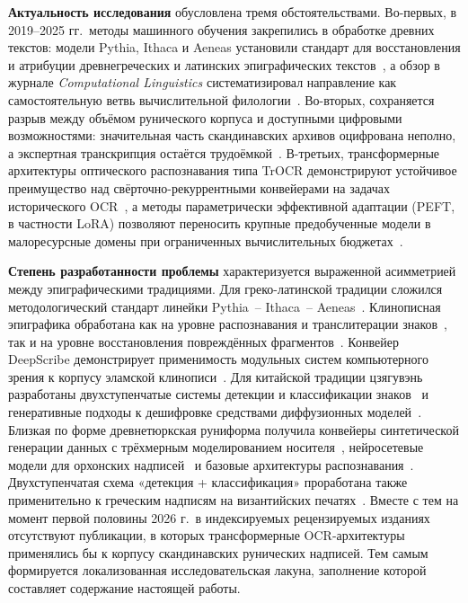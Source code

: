 \documentclass[a4paper,12pt]{extarticle}
\begin{document}
\textbf{Актуальность исследования} обусловлена тремя обстоятельствами. Во-первых, в 2019--2025 гг.\ методы машинного обучения закрепились в обработке древних текстов: модели Pythia, Ithaca и Aeneas установили стандарт для восстановления и атрибуции древнегреческих и латинских эпиграфических текстов~\cite{assael2019,assael2022,assael2025}, а обзор в журнале \textit{Computational Linguistics} систематизировал направление как самостоятельную ветвь вычислительной филологии~\cite{sommerschield2023}. Во-вторых, сохраняется разрыв между объёмом рунического корпуса и доступными цифровыми возможностями: значительная часть скандинавских архивов оцифрована неполно, а экспертная транскрипция остаётся трудоёмкой~\cite{magin2024}. В-третьих, трансформерные архитектуры оптического распознавания типа TrOCR демонстрируют устойчивое преимущество над свёрточно-рекуррентными конвейерами на задачах исторического OCR~\cite{li2023}, а методы параметрически эффективной адаптации (PEFT, в частности LoRA) позволяют переносить крупные предобученные модели в малоресурсные домены при ограниченных вычислительных бюджетах~\cite{hu2022}.
 
\textbf{Степень разработанности проблемы} характеризуется выраженной асимметрией между эпиграфическими традициями. Для греко-латинской традиции сложился методологический стандарт линейки Pythia~-- Ithaca~-- Aeneas~\cite{assael2019,assael2022,assael2025}. Клинописная эпиграфика обработана как на уровне распознавания и транслитерации знаков~\cite{gordin2020}, так и на уровне восстановления повреждённых фрагментов~\cite{fetaya2020}. Конвейер DeepScribe демонстрирует применимость модульных систем компьютерного зрения к корпусу эламской клинописи~\cite{williams2025}. Для китайской традиции цзягувэнь разработаны двухступенчатые системы детекции и классификации знаков~\cite{fujikawa2023} и генеративные подходы к дешифровке средствами диффузионных моделей~\cite{guan2024}. Близкая по форме древнетюркская руниформа получила конвейеры синтетической генерации данных с трёхмерным моделированием носителя~\cite{derin2024}, нейросетевые модели для орхонских надписей~\cite{mukashev2024} и базовые архитектуры распознавания~\cite{taheri2025}. Двухступенчатая схема «детекция + классификация» проработана также применительно к греческим надписям на византийских печатях~\cite{rageau2025}. Вместе с тем на момент первой половины 2026 г.\ в индексируемых рецензируемых изданиях отсутствуют публикации, в которых трансформерные OCR-архитектуры применялись бы к корпусу скандинавских рунических надписей. Тем самым формируется локализованная исследовательская лакуна, заполнение которой составляет содержание настоящей работы.
 
\end{document}
